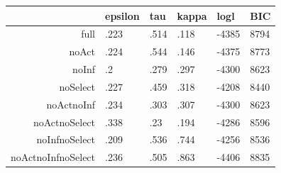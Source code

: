 \begin{table}[ht]
\centering
\begin{tabular}{rlllll}
  \hline
 & epsilon & tau & kappa & logl & BIC \\ 
  \hline
full & .223 & .514 & .118 & -4385 & 8794 \\ 
  noAct & .224 & .544 & .146 & -4375 & 8773 \\ 
  noInf & .2 & .279 & .297 & -4300 & 8623 \\ 
  noSelect & .227 & .459 & .318 & -4208 & 8440 \\ 
  noActnoInf & .234 & .303 & .307 & -4300 & 8623 \\ 
  noActnoSelect & .338 & .23 & .194 & -4286 & 8596 \\ 
  noInfnoSelect & .209 & .536 & .744 & -4256 & 8536 \\ 
  noActnoInfnoSelect & .236 & .505 & .863 & -4406 & 8835 \\ 
   \hline
\end{tabular}
\end{table}
